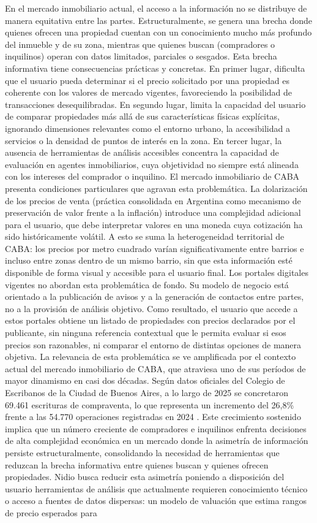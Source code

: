 En el mercado inmobiliario actual, el acceso a la información no se distribuye de manera equitativa entre las partes. Estructuralmente, se genera una brecha donde quienes ofrecen una propiedad cuentan con un conocimiento mucho más profundo del inmueble y de su zona, mientras que quienes buscan (compradores o inquilinos) operan con datos limitados, parciales o sesgados. Esta brecha informativa tiene consecuencias prácticas y concretas. En primer lugar, dificulta que el usuario pueda determinar si el precio solicitado por una propiedad es coherente con los valores de mercado vigentes, favoreciendo la posibilidad de transacciones desequilibradas. En segundo lugar, limita la capacidad del usuario de comparar propiedades más allá de sus características físicas explícitas, ignorando dimensiones relevantes como el entorno urbano, la accesibilidad a servicios o la densidad de puntos de interés en la zona. En tercer lugar, la ausencia de herramientas de análisis accesibles concentra la capacidad de evaluación en agentes inmobiliarios, cuya objetividad no siempre está alineada con los intereses del comprador o inquilino. El mercado inmobiliario de CABA presenta condiciones particulares que agravan esta problemática. La dolarización de los precios de venta (práctica consolidada en Argentina como mecanismo de preservación de valor frente a la inflación) introduce una complejidad adicional para el usuario, que debe interpretar valores en una moneda cuya cotización ha sido históricamente volátil. A esto se suma la heterogeneidad territorial de CABA: los precios por metro cuadrado varían significativamente entre barrios e incluso entre zonas dentro de un mismo barrio, sin que esta información esté disponible de forma visual y accesible para el usuario final. Los portales digitales vigentes no abordan esta problemática de fondo. Su modelo de negocio está orientado a la publicación de avisos y a la generación de contactos entre partes, no a la provisión de análisis objetivo. Como resultado, el usuario que accede a estos portales obtiene un listado de propiedades con precios declarados por el publicante, sin ninguna referencia contextual que le permita evaluar si esos precios son razonables, ni comparar el entorno de distintas opciones de manera objetiva. La relevancia de esta problemática se ve amplificada por el contexto actual del mercado inmobiliario de CABA, que atraviesa uno de sus períodos de mayor dinamismo en casi dos décadas. Según datos oficiales del Colegio de Escribanos de la Ciudad de Buenos Aires, a lo largo de 2025 se concretaron 69.461 escrituras de compraventa, lo que representa un incremento del 26,8\% frente a las 54.770 operaciones registradas en 2024 \parencite{ColegioEscribanos2026}. Este crecimiento sostenido implica que un número creciente de compradores e inquilinos enfrenta decisiones de alta complejidad económica en un mercado donde la asimetría de información persiste estructuralmente, consolidando la necesidad de herramientas que reduzcan la brecha informativa entre quienes buscan y quienes ofrecen propiedades. Nidio busca reducir esta asimetría poniendo a disposición del usuario herramientas de análisis que actualmente requieren conocimiento técnico o acceso a fuentes de datos dispersas: un modelo de valuación que estima rangos de precio esperados para 